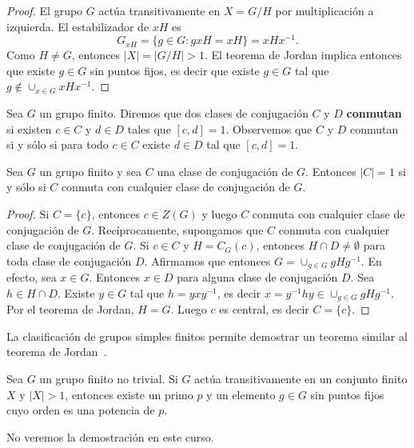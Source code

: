 \begin{proof}
El grupo $G$ actúa transitivamente en $X=G/H$ por multiplicación a izquierda. 
El estabilizador de $xH$ es 
\[
G_{xH}=\{g\in G:gxH=xH\}=xHx^{-1}.
\]
Como $H\ne G$, entonces $|X|=|G/H|>1$. El teorema de Jordan implica entonces que existe $g\in G$ sin puntos fijos, es decir
que existe $g\in G$ tal que $g\not\in\cup_{x\in G}xHx^{-1}$. 
\end{proof}

Sea $G$ un grupo finito. Diremos que dos clases de conjugación $C$ y $D$ \textbf{conmutan} si existen 
$c\in C$ y $d\in D$ tales que $[c,d]=1$. 
Observemos que $C$ y $D$ conmutan si y sólo si para todo $c\in C$ existe $d\in D$ tal que $[c,d]=1$. 

\begin{corollary}[Wildon]
    Sea $G$ un grupo finito y sea $C$ una clase de conjugación de $G$. Entonces
    $|C|=1$ si y sólo si $C$ conmuta con cualquier clase de conjugación de $G$. 
\end{corollary}
    
\begin{proof}
    Si $C=\{c\}$, entonces $c\in Z(G)$ y luego $C$ conmuta con cualquier clase de conjugación de $G$. Recíprocamente, supongamos que 
    $C$ conmuta con cualquier clase de conjugación de $G$. Si $c\in C$ y $H=C_G(c)$, entonces $H\cap D\ne\emptyset$ para toda
    clase de conjugación $D$. Afirmamos que entonces $G=\cup_{g\in G}gHg^{-1}$. En efecto, sea $x\in G$. Entonces $x\in D$ 
    para alguna clase de conjugación $D$. 
    Sea 
    $h\in H\cap D$. Existe $y\in G$ tal que $h=yxy^{-1}$, es decir $x=y^{-1}hy\in \cup_{g\in G}gHg^{-1}$. Por el teorema de Jordan, 
    $H=G$. Luego $c$ es central, es decir $C=\{c\}$. 
\end{proof}

La clasificación de grupos simples finitos permite demostrar un teorema
similar al teorema de Jordan~\cite{MR636194}. 

\begin{theorem}
Sea $G$ un grupo finito no trivial. Si $G$ actúa transitivamente en un conjunto finito $X$ y $|X|>1$, entonces
existe un primo $p$ y un elemento $g\in G$ sin puntos fijos cuyo orden es una potencia de $p$. 
\end{theorem}

No veremos la demostración en este curso. 

